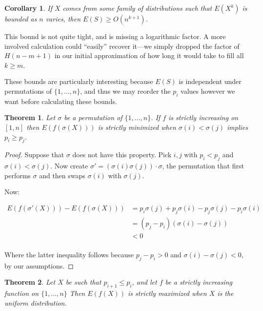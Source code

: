\documentclass[a4paper]{book}
\newtheorem{corollary}{Corollary}
\newtheorem{theorem}{Theorem}
\begin{document}
\begin{corollary}
If \(X\) comes from some family of distributions such that \(E(X^k)\) is bounded as \(n\) varies,
then \(E(S) \geq O(n^{k + 1})\).
\end{corollary}

This bound is not quite tight,
and is missing a logarithmic factor.
A more involved calculation could ``easily'' recover it---we
simply dropped the factor of \(H(n - m + 1)\) in our initial approximation of how long it would take to fill all \(k \geq m\).

These bounds are particularly interesting because \(E(S)\) is independent under permutations of \(\{1, \ldots, n\}\),
and thus we may reorder the \(p_i\) values however we want before calculating these bounds.

\begin{theorem}
Let \(\sigma\) be a permutation of \(\{1, \ldots, n\}\).
If \(f\) is strictly increasing on \([1, n]\) then \(E(f(\sigma(X)))\) is strictly minimized when \(\sigma(i) < \sigma(j)\) implies \(p_i \geq p_j\).
\end{theorem}

\begin{proof}
Suppose that \(\sigma\) does not have this property.
Pick \(i, j\) with \(p_i < p_j\) and \(\sigma(i) < \sigma(j)\).
Now create \(\sigma' = (\sigma(i) \sigma(j)) \cdot \sigma\),
the permutation that first performs \(\sigma\) and then swaps \(\sigma(i)\) with \(\sigma(j)\).

Now:

\begin{align*}
E(f(\sigma'(X))) - E(f(\sigma(X))) &= p_i \sigma(j) + p_j \sigma(i) -  p_j \sigma(j) - p_i \sigma(i) \\
&= (p_j - p_i) (\sigma(i) - \sigma(j)) \\
&< 0\\ 
\end{align*}

Where the latter inequality follows because \(p_j - p_i > 0\) and \(\sigma(i) - \sigma(j) < 0\),
by our assumptions.
\end{proof}

\begin{theorem}
Let \(X\) be such that \(p_{i + 1} \leq p_i\),
and let \(f\) be a strictly increasing function on \(\{1, \ldots, n\}\)
Then \(E(f(X))\) is strictly maximized when \(X\) is the uniform distribution.
\end{theorem}
\end{document}
